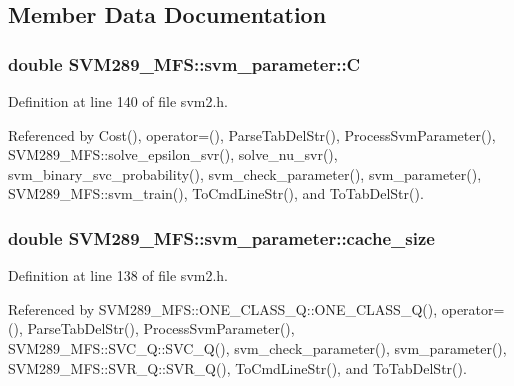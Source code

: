 \subsection{Member Data Documentation}
\subsubsection[{\texorpdfstring{C}{C}}]{\setlength{\rightskip}{0pt plus 5cm}double S\+V\+M289\+\_\+\+M\+F\+S\+::svm\+\_\+parameter\+::C}\hypertarget{struct_s_v_m289___m_f_s_1_1svm__parameter_aac66b1e8a16d4076bfe8b45e82bd8e7a}{}\label{struct_s_v_m289___m_f_s_1_1svm__parameter_aac66b1e8a16d4076bfe8b45e82bd8e7a}


Definition at line 140 of file svm2.\+h.



Referenced by Cost(), operator=(), Parse\+Tab\+Del\+Str(), Process\+Svm\+Parameter(), S\+V\+M289\+\_\+\+M\+F\+S\+::solve\+\_\+epsilon\+\_\+svr(), solve\+\_\+nu\+\_\+svr(), svm\+\_\+binary\+\_\+svc\+\_\+probability(), svm\+\_\+check\+\_\+parameter(), svm\+\_\+parameter(), S\+V\+M289\+\_\+\+M\+F\+S\+::svm\+\_\+train(), To\+Cmd\+Line\+Str(), and To\+Tab\+Del\+Str().

\subsubsection[{\texorpdfstring{cache\+\_\+size}{cache_size}}]{\setlength{\rightskip}{0pt plus 5cm}double S\+V\+M289\+\_\+\+M\+F\+S\+::svm\+\_\+parameter\+::cache\+\_\+size}\hypertarget{struct_s_v_m289___m_f_s_1_1svm__parameter_a08f7b3453369bccdfe43fd9ea1f28241}{}\label{struct_s_v_m289___m_f_s_1_1svm__parameter_a08f7b3453369bccdfe43fd9ea1f28241}


Definition at line 138 of file svm2.\+h.



Referenced by S\+V\+M289\+\_\+\+M\+F\+S\+::\+O\+N\+E\+\_\+\+C\+L\+A\+S\+S\+\_\+\+Q\+::\+O\+N\+E\+\_\+\+C\+L\+A\+S\+S\+\_\+\+Q(), operator=(), Parse\+Tab\+Del\+Str(), Process\+Svm\+Parameter(), S\+V\+M289\+\_\+\+M\+F\+S\+::\+S\+V\+C\+\_\+\+Q\+::\+S\+V\+C\+\_\+\+Q(), svm\+\_\+check\+\_\+parameter(), svm\+\_\+parameter(), S\+V\+M289\+\_\+\+M\+F\+S\+::\+S\+V\+R\+\_\+\+Q\+::\+S\+V\+R\+\_\+\+Q(), To\+Cmd\+Line\+Str(), and To\+Tab\+Del\+Str().

